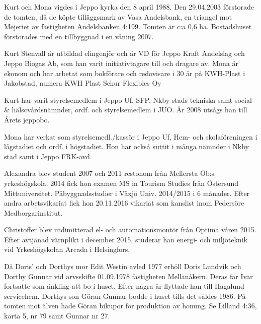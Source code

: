Kurt och Mona vigdes i Jeppo	kyrka den 8 april 1988. Den 29.04.2003 förstorade de tomten, då de köpte tilläggsmark av Vasa Andelsbank, en triangel mot Mejeriet av fastigheten Andelsbanken 4:199. Tomten är c:a 0,6 ha.	Bostadshuset förstorades med en tillbyggnad i en våning 2007.

Kurt Stenvall är utbildad elingenjör och är VD för Jeppo Kraft Andelslag och Jeppo Biogas Ab, som han varit initiativtagare till och dragare av. Mona är ekonom och har arbetat som bokförare och redovisare i 30 år på	KWH-Plast i Jakobstad, numera KWH Plast Schur Flexibles Oy
\begin{jhchildren}
  \item {}
  \item {}
\end{jhchildren}
Kurt har varit styrelsemedlem i Jeppo Uf, SFP, Nkby stads tekniska samt social- \& hälsovårdsnämnder, ordf. och styrelsemedlem i JUO. År 2008 utsågs han till Årets jeppobo.

Mona har verkat som styrelsemedl./kassör i Jeppo Uf, Hem- och skolaföreningen i lågstadiet och ordf. i högstadiet. Hon har också suttit i många nämnder i Nkby stad samt i Jeppo FRK-avd.

Alexandra blev student 2007 och 2011 restonom från Mellersta Öb:s yrkeshögskola. 2014 fick hon examen MS in Tourism Studies från Östersund Mittuniversitet. Påbyggnadsstudier i Växjö Univ. 2014/2015 i 6 månader. Efter andra arbetsvikariat fick hon 20.11.2016 vikariat som kanslist inom Pedersöre Medborgarinstitut.

Christoffer blev utdimitterad el- och automationsmontör från Optima våren 2015. Efter avtjänad värnplikt i december 2015, studerar han energi- och miljöteknik vid Yrkeshögskolan Arcada i Helsingfors.


%
Då Doris' och Dorthys mor Edit Westin avled 1977 erhöll Doris Lundvik och Dorthy Gunnar vid arvsskifte 01.09.1978 fastigheten Mellanåkern. Deras far Ivar fortsatte som änkling att bo i huset. Efter några år flyttade han till Hagalund servicehem. Dorthys son Göran Gunnar bodde i huset tills det såldes 1986. På tomten mot älven hade Göran bikupor för produktion av honung. Se Lilland 4:36, karta 5, nr 79 samt Gunnar nr 27.


